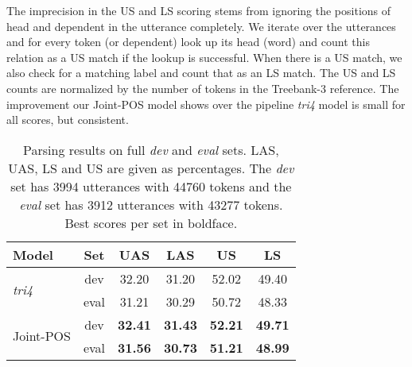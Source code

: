 \documentclass[11pt,letterpaper]{article}
\begin{document}
The imprecision in the US and LS scoring stems from ignoring the positions of head and dependent in the utterance completely. We iterate over the utterances and for every token (or dependent) look up its head (word) and count this relation as a US match if the lookup is successful. When there is a US match, we also check for a matching label and count that as an LS match. The US and LS counts are normalized by the number of tokens in the Treebank-3 reference. The improvement our Joint-POS model shows over the pipeline \emph{tri4} model is small for all scores, but consistent.
\begin{table}[h]
    \centering
    \begin{tabular}{@{}lccccc@{}}
        \toprule
        Model                                                                       & Set  & \multicolumn{1}{c}{UAS} & \multicolumn{1}{c}{LAS} & \multicolumn{1}{c}{US} & \multicolumn{1}{c}{LS} \\ \midrule
        \multirow{2}{*}{\emph{tri4}}      & dev  & 32.20                   & 31.20                   & 52.02                  & 49.40                  \\
        & eval & 31.21                   & 30.29                   & 50.72                  & 48.33                  \\ \midrule
        \multirow{2}{*}{Joint-POS} & dev  & \textbf{32.41}          & \textbf{31.43}          & \textbf{52.21}         & \textbf{49.71}         \\
        & eval & \textbf{31.56}          & \textbf{30.73}          & \textbf{51.21}         & \textbf{48.99}         \\ \bottomrule
    \end{tabular}
    \caption[Parsing results on full \emph{dev} and \emph{eval} sets.]{Parsing results on full \emph{dev} and \emph{eval} sets. LAS, UAS, LS and US are given as percentages. The \emph{dev} set has 3994 utterances with 44760 tokens and the \emph{eval} set has 3912 utterances with 43277 tokens. Best scores per set in boldface.}
    \label{tab:relres}
\end{table}
\end{document}
